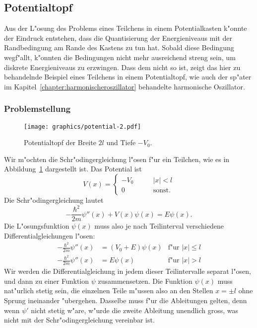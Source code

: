 \subsection{Potentialtopf\label{subsection:potentialtopf}}
Aus der L"osung des Problems eines Teilchens in einem Potentialkasten
k"onnte der Eindruck entstehen, dass die Quantisierung der Energieniveaus
mit der Randbedingung am Rande des Kastens zu tun hat.
Sobald diese Bedingung wegf"allt, k"onnten die Bedingungen nicht mehr
ausreichend streng sein, um diskrete Energieniveaus zu erzwingen.
Dass dem nicht so ist, zeigt das hier zu behandelnde Beispiel eines
Teilchens in einem Potentialtopf, wie auch der sp"ater im
Kapitel~\ref{chapter:harmonischeroszillator} behandelte harmonische Oszillator.

\subsubsection{Problemstellung}
\begin{figure}
\centering
\texttt{[image: graphics/potential-2.pdf]}
\caption{Potentialtopf der Breite $2l$ und Tiefe $-V_0$.
\label{skript:potentialtopf}}
\end{figure}
Wir m"ochten die Schr"odingergleichung l"osen f"ur ein Teilchen, wie es
in Abbildung~\ref{skript:potentialtopf} dargestellt ist.
Das Potential ist
\[
V(x)
=
\begin{cases}
-V_0&\qquad|x|<l\\
0&\qquad\text{sonst}.
\end{cases}
\]
Die Schr"odingergleichung lautet
\[
-\frac{\hbar^2}{2m}\psi''(x)+V(x)\psi(x)=E\psi(x).
\]
Die L"osungsfunktion $\psi(x)$ muss also je nach Teilinterval
verschiedene Differentialgleichungen l"osen:
\begin{equation}
\begin{aligned}
-\frac{\hbar^2}{2m}\psi''(x)&=(V_0+E)\psi(x)&\text{f"ur $|x|\le l$}
\\
-\frac{\hbar^2}{2m}\psi''(x)&=E\psi(x)      &\text{f"ur $|x|>l$}
\end{aligned}
\label{skript:potentialtopf-gleichungen}
\end{equation}
Wir werden die Differentialgleichung in jedem dieser Teilintervalle
separat l"osen, und dann zu einer Funktion $\psi$ zusammensetzen.
Die Funktion $\psi(x)$ muss nat"urlich stetig sein, die einzelnen
Teile m"ussen also an den Stellen $x=\pm l$ ohne Sprung ineinander
"ubergehen.
Dasselbe muss f"ur die Ableitungen gelten, denn wenn $\psi'$  nicht
stetig w"are, w"urde die zweite Ableitung unendlich gross, was nicht
mit der Schr"odingergleichung vereinbar ist.

